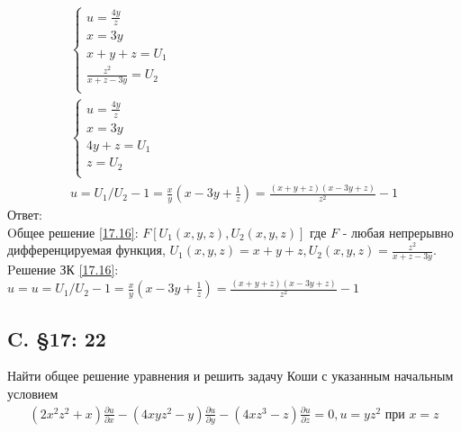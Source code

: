 \documentclass{article}
\begin{document}
\begin{gather*}
\begin{cases}
        u=\frac{4y}{z}\\
        x=3y\\
        x+y+z=U_1\\
        \frac{z^2}{x+z-3y}=U_2\\
    \end{cases}    \\
    \begin{cases}
    u=\frac{4y}{z}\\
        x=3y\\
        4y+z=U_1\\
        z=U_2\\
    \end{cases}    \\
    u=U_1/ U_2-1 = \frac{x}{y}(x-3y+\frac{1}{z})=\frac{(x+y+z)(x-3 y+z)}{z^{2}}-1
\end{gather*}
Ответ:\\
 Oбщее решение \ref{17.16}: $F[U_1(x,y,z),U_2(x,y,z)]$ где $F$ - любая непрерывно дифференцируемая функция, $U_1(x,y,z)=x+y+z, U_2(x,y,z)=\frac{z^2}{x+z-3y}$.\\
 Pешение ЗК \ref{17.16}: $u=u=U_1/ U_2-1 = \frac{x}{y}(x-3y+\frac{1}{z})=\frac{(x+y+z)(x-3 y+z)}{z^{2}}-1$


\subsection{C. \S17: 22}
Найти общее решение уравнения и решить задачу Коши с указанным
начальным условием
\begin{equation}\label{17.22}
\begin{array}{l}
\left(2 x^{2} z^{2}+x\right) \frac{\partial u}{\partial x}-\left(4 x y z^{2}-y\right) \frac{\partial u}{\partial y}-\left(4 x z^{3}-z\right) \frac{\partial u}{\partial z}=0, u=y z^{2} \text { при } x=z
\end{array}
\end{equation}
\end{document}
